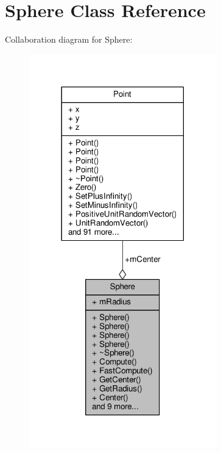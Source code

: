 \hypertarget{classSphere}{}\section{Sphere Class Reference}
\label{classSphere}


Collaboration diagram for Sphere\+:
\nopagebreak
\begin{figure}[H]
\begin{center}
\leavevmode
\includegraphics[width=230pt]{d7/d21/classSphere__coll__graph}
\end{center}
\end{figure}
